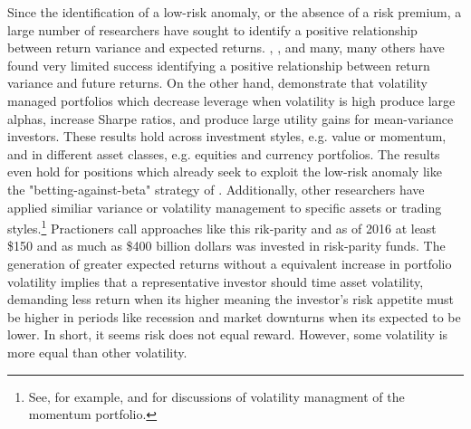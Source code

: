 Since the identification of a low-risk anomaly, or the absence of a risk premium, a large number of researchers have sought to identify a positive relationship between return variance and expected returns. \citet{CAMPBELL1987373}, \cite{FRENCH19873}, \citet{glosten_1993} and many, many others have found very limited success identifying a positive relationship between return variance and future returns. On the other hand, \citet{moreira_volatility-managed_2017} demonstrate that volatility managed portfolios which decrease leverage when volatility is high produce large alphas, increase Sharpe ratios, and produce large utility gains for mean-variance investors. These results hold across investment styles, e.g. value or momentum, and in different asset classes, e.g. equities and currency portfolios. The results even hold for positions which already seek to exploit the low-risk anomaly like the "betting-against-beta" strategy of \citet{frazzini_betting_2014}. Additionally, other researchers have applied similiar variance or volatility management to specific assets or trading styles.\footnote{See, for example, \citet{barroso_momentum_2015} and \citet{kim_time_2016} for discussions of volatility managment of the momentum portfolio.} Practioners call approaches like this rik-parity and as of 2016 at least \$150 and as much as \$400 billion dollars was invested in risk-parity funds.\citep{steward_truly_2010,cao_risk_2016} The generation of greater expected returns without a equivalent increase in portfolio volatility implies that a representative investor should time asset volatility, demanding less return when its higher meaning the investor's risk appetite must be higher in periods like recession and market downturns when its expected to be lower. In short, it seems risk does not equal reward. However, some volatility is more equal than other volatility.

